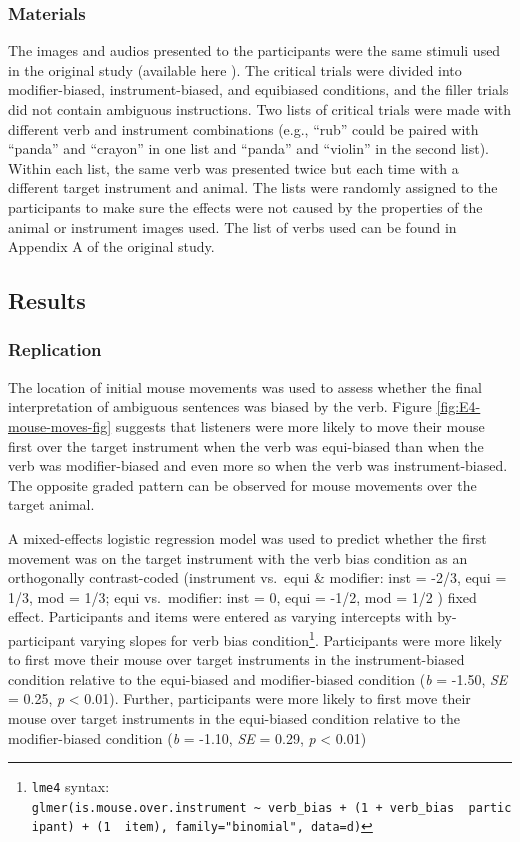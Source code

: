 \documentclass[
  man,floatsintext]{apa6}
\begin{document}
\hypertarget{materials-1}{%
\subsubsection{Materials}\label{materials-1}}

The images and audios presented to the participants were the same
stimuli used in the original study (available here ). The critical
trials were divided into modifier-biased, instrument-biased, and
equibiased conditions, and the filler trials did not contain ambiguous
instructions. Two lists of critical trials were made with different verb
and instrument combinations (e.g., ``rub'' could be paired with ``panda''
and ``crayon'' in one list and ``panda'' and ``violin'' in the second list).
Within each list, the same verb was presented twice but each time with a
different target instrument and animal. The lists were randomly assigned
to the participants to make sure the effects were not caused by the
properties of the animal or instrument images used. The list of verbs
used can be found in Appendix A of the original study.

\hypertarget{results-3}{%
\subsection{Results}\label{results-3}}

\hypertarget{replication-1}{%
\subsubsection{Replication}\label{replication-1}}

The location of initial mouse movements was used to assess whether the final interpretation of ambiguous sentences was biased by the verb. Figure \ref{fig:E4-mouse-moves-fig} suggests that listeners were more likely to move their mouse first over the target instrument when the verb was equi-biased than when the verb was modifier-biased and even more so when the verb was instrument-biased. The opposite graded pattern can be observed for mouse movements over the target animal.

A mixed-effects logistic regression model was used to predict whether the first movement was on the target instrument with the verb bias condition as an orthogonally contrast-coded (instrument vs.~equi \& modifier: inst = -2/3, equi = 1/3, mod = 1/3; equi vs.~modifier: inst = 0, equi = -1/2, mod = 1/2 ) fixed effect. Participants and items were entered as varying intercepts with by-participant varying slopes for verb bias condition\footnote{\texttt{lme4} syntax: \texttt{glmer(is.mouse.over.instrument\ \textasciitilde{}\ verb\_bias\ +\ (1\ +\ verb\_bias\ \textbar{}\ participant)\ +\ (1\ \textbar{}\ item),\ family="binomial",\ data=d)}}. Participants were more likely to first move their mouse over target instruments in the instrument-biased condition relative to the equi-biased and modifier-biased condition (\emph{b} = -1.50, \emph{SE} = 0.25, \emph{p} \textless{} 0.01). Further, participants were more likely to first move their mouse over target instruments in the equi-biased condition relative to the modifier-biased condition (\emph{b} = -1.10, \emph{SE} = 0.29, \emph{p} \textless{} 0.01)
\end{document}
